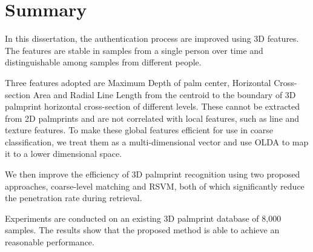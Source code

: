\section{Summary}

In this dissertation, the authentication process are improved using 3D features. The features are stable in samples from a single person over time and distinguishable among samples from different people.

Three features adopted are Maximum Depth of palm center, Horizontal Cross-section Area and Radial Line Length from the centroid to the boundary of 3D palmprint horizontal cross-section of different levels. These cannot be extracted from 2D palmprints and are not correlated with local features, such as line and texture features. To make these global features efficient for use in coarse classification, we treat them as a multi-dimensional vector and use OLDA to map it to a lower dimensional space.

We then improve the efficiency of 3D palmprint recognition using two proposed approaches, coarse-level matching and RSVM, both of which significantly reduce the penetration rate during retrieval.

Experiments are conducted on an existing 3D palmprint database of 8,000 samples. The results show that the proposed method is able to achieve an reasonable performance.

